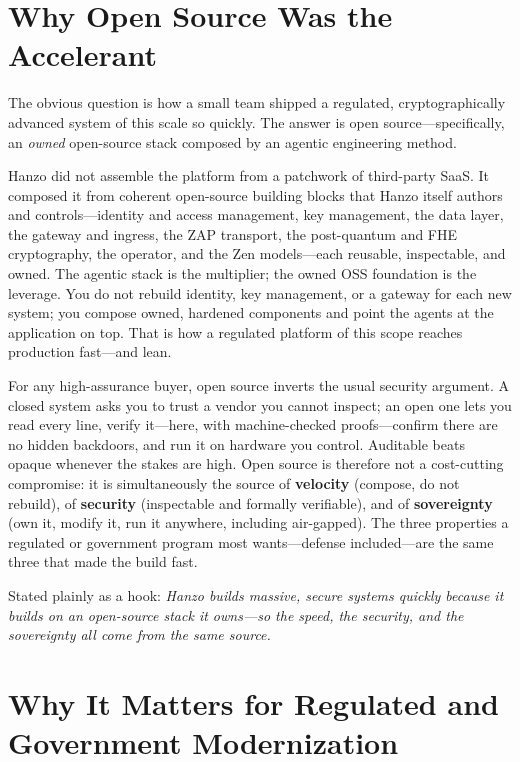 \documentclass[11pt,letterpaper]{article}
\begin{document}
\section{Why Open Source Was the Accelerant}

The obvious question is how a small team shipped a regulated, cryptographically
advanced system of this scale so quickly. The answer is open source---specifically,
an \emph{owned} open-source stack composed by an agentic engineering method.

Hanzo did not assemble the platform from a patchwork of third-party SaaS. It
composed it from coherent open-source building blocks that Hanzo itself authors
and controls---identity and access management, key management, the data layer, the
gateway and ingress, the ZAP transport, the post-quantum and FHE cryptography, the
operator, and the Zen models---each reusable, inspectable, and owned. The agentic
stack is the multiplier; the owned OSS foundation is the leverage. You do not
rebuild identity, key management, or a gateway for each new system; you compose
owned, hardened components and point the agents at the application on top. That is
how a regulated platform of this scope reaches production fast---and lean.

For any high-assurance buyer, open source inverts the usual security argument. A
closed system asks
you to trust a vendor you cannot inspect; an open one lets you read every line,
verify it---here, with machine-checked proofs---confirm there are no hidden
backdoors, and run it on hardware you control. Auditable beats opaque whenever the
stakes are high. Open source is therefore not a cost-cutting compromise: it is
simultaneously the source of \textbf{velocity} (compose, do not rebuild), of
\textbf{security} (inspectable and formally verifiable), and of \textbf{sovereignty}
(own it, modify it, run it anywhere, including air-gapped). The three properties a
regulated or government program most wants---defense included---are the same three
that made the build fast.

Stated plainly as a hook: \emph{Hanzo builds massive, secure systems quickly
because it builds on an open-source stack it owns---so the speed, the security, and
the sovereignty all come from the same source.}

\section{Why It Matters for Regulated and Government Modernization}
\end{document}
